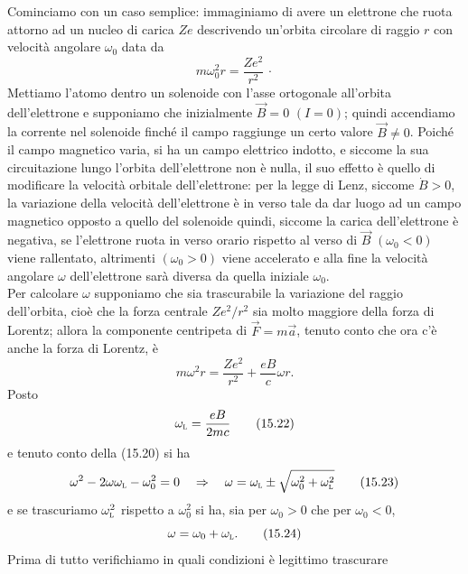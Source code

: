 Cominciamo con un caso semplice: immaginiamo di avere un elettrone che ruota
attorno ad un nucleo di carica $Ze$ descrivendo un'orbita circolare di raggio
$r$ con velocit\`a angolare $\omega_0$ data da
\begin{equation}
  m\omega_0^2r=\frac{Ze^2}{r^2}\,\cdot
  \tag{15.20}
\end{equation}
Mettiamo l'atomo dentro un solenoide con l'asse ortogonale all'orbita
dell'elettrone e supponiamo che inizialmente $\vec B=0$ $(I=0)$; quindi
accendiamo la corrente nel solenoide finch\'e il campo raggiunge un certo valore
$\vec B\neq0$. Poich\'e il campo magnetico varia, si ha un campo elettrico
indotto, e siccome la sua circuitazione lungo l'orbita dell'elettrone non \`e
nulla, il suo effetto \`e quello di modificare la velocit\`a orbitale
dell'elettrone: per la
legge di Lenz, siccome $\dot B>0$, la variazione della velocit\`a dell'elettrone
\`e in verso tale da dar luogo ad un campo magnetico opposto a quello del
solenoide quindi, siccome la carica dell'elettrone \`e negativa, se l'elettrone
ruota in verso orario rispetto al verso di $\vec B$ $(\omega_0<0)$ viene
rallentato, altrimenti $(\omega_0>0)$ viene accelerato e alla fine la velocit\`a
angolare $\omega$ dell'elettrone sar\`a diversa da quella iniziale $\omega_0$.\\
Per calcolare $\omega$ supponiamo che sia trascurabile la variazione del raggio
dell'orbita, cio\`e che la forza centrale $Ze^2/r^2$ sia molto maggiore della
forza di Lorentz; allora la componente centripeta di $\vec F=m\vec a$, tenuto
conto che ora c'\`e anche la forza di Lorentz, \`e
\begin{equation}
  m\omega^2r=\frac{Ze^2}{r^2}+\frac{eB}{c}\omega r.
  \tag{15.21}
\end{equation}
Posto
\begin{equation}
  \omega_{\textsc l}=\frac{eB}{2mc}
  \tag{15.22}
\end{equation}
e tenuto conto della (15.20) si ha
\begin{equation}
  \omega^2-2\omega\omega_{\textsc l}-\omega_0^2=0\quad\Rightarrow
  \quad\omega=\omega_{\textsc l}\pm\sqrt{\omega_0^2+\omega_{\textsc l}^2}
  \tag{15.23}
\end{equation}
e se trascuriamo $\omega_{\textsc l}^2$ rispetto a $\omega_0^2$ si ha, sia per
$\omega_0>0$ che per $\omega_0<0$,
\begin{equation}
  \omega=\omega_0+\omega_{\textsc l}.
  \tag{15.24}
\end{equation}
Prima di tutto verifichiamo in quali condizioni \`e legittimo trascurare

